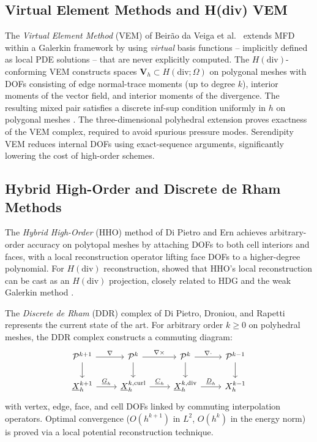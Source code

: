 \subsection{Virtual Element Methods and H(div) VEM}

The \emph{Virtual Element Method} (VEM) of Beir\~{a}o da Veiga et al.\
\cite{veiga2013basic,BeiraoDaVeiga2013} extends MFD within a Galerkin
framework by using \emph{virtual} basis functions -- implicitly defined as
local PDE solutions -- that are never explicitly computed.  The
$H(\mathrm{div})$-conforming VEM \cite{veigaHdivVEM2016,BeiraoDaVeiga2016,%
BeiraoDaVeigaMixed2016} constructs spaces $\mathbf{V}_h \subset
H(\mathrm{div};\Omega)$ on polygonal meshes with DOFs consisting of
edge normal-trace moments (up to degree $k$), interior moments of the
vector field, and interior moments of the divergence.  The resulting mixed
pair satisfies a discrete inf-sup condition uniformly in $h$ on polygonal
meshes \cite{BrezziFalkMarini2014}.  The three-dimensional polyhedral
extension \cite{veiga3DVEM2017} proves exactness of the VEM complex,
required to avoid spurious pressure modes.  Serendipity VEM
\cite{brezziSerendipityVEM2017} reduces internal DOFs using exact-sequence
arguments, significantly lowering the cost of high-order schemes.

\subsection{Hybrid High-Order and Discrete de Rham Methods}

The \emph{Hybrid High-Order} (HHO) method of Di Pietro and Ern
\cite{dipietroHHO2015} achieves arbitrary-order accuracy on polytopal meshes
by attaching DOFs to both cell interiors and faces, with a local
reconstruction operator lifting face DOFs to a higher-degree polynomial.
For $H(\mathrm{div})$ reconstruction, \cite{dipietroHHOdiv2017} showed that
HHO's local reconstruction can be cast as an $H(\mathrm{div})$ projection,
closely related to HDG \cite{cockburnHDG2009} and the weak Galerkin method
\cite{dipietroBridge2016}.

The \emph{Discrete de Rham} (DDR) complex of Di Pietro, Droniou, and
Rapetti \cite{dipietroDDR2021} represents the current state of the art.
For arbitrary order $k\ge0$ on polyhedral meshes, the DDR complex constructs
a commuting diagram:
\[
\begin{tikzcd}
  \mathcal{P}^{k+1} \arrow[r,"\nabla"] \arrow[d] &
  \mathcal{P}^k \arrow[r,"\nabla\times"] \arrow[d] &
  \mathcal{P}^k \arrow[r,"\nabla\cdot"] \arrow[d] &
  \mathcal{P}^{k-1} \arrow[d] \\
  \underline{X}^{k+1}_h \arrow[r,"\underline{G}_h"] &
  \underline{X}^{k,\mathrm{curl}}_h \arrow[r,"\underline{C}_h"] &
  \underline{X}^{k,\mathrm{div}}_h \arrow[r,"\underline{D}_h"] &
  X^{k-1}_h
\end{tikzcd}
\]
with vertex, edge, face, and cell DOFs linked by commuting interpolation
operators.  Optimal convergence ($O(h^{k+1})$ in $L^2$, $O(h^k)$ in the
energy norm) is proved via a local potential reconstruction technique.

